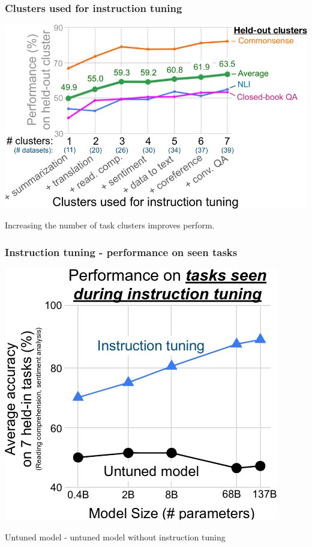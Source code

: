\documentclass{beamer}
\begin{document}
\begin{frame}
    \frametitle{Clusters used for instruction tuning}
    \begin{center}
        \includegraphics[scale=1.35]{img/score_instruction_tuning.png}
    \end{center}
    \footnotesize Increasing the number of task clusters improves perform.
\end{frame}

\begin{frame}
    \frametitle{Instruction tuning - performance on \textbf{seen} tasks}
    \begin{center}
        \includegraphics[scale=1.6]{img/performance_1.png}
    \end{center}
    \footnotesize Untuned model - untuned model without instruction tuning
\end{frame}
\end{document}
